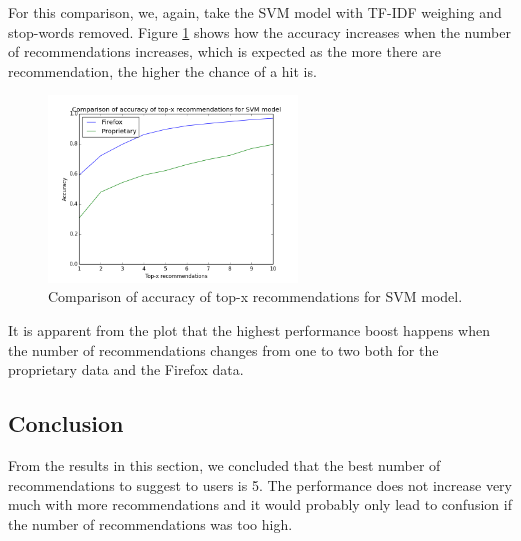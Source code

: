 For this comparison, we, again, take the SVM model with TF-IDF weighing and stop-words removed. Figure \ref{fig:results.topx.svm_accuracy} shows how the accuracy increases when the number of recommendations increases, which is expected as the more there are recommendation, the higher the chance of a hit is.

\begin{figure}[htbp]
    \centering
        \includegraphics[width=250px]{./images/top_x_comparison/svm_accuracy.png}
    \caption{Comparison of accuracy of top-x recommendations for SVM model.}
    \label{fig:results.topx.svm_accuracy}
\end{figure}

It is apparent from the plot that the highest performance boost happens when the number of recommendations changes from one to two both for the proprietary data and the Firefox data. 

\subsection{Conclusion}

From the results in this section, we concluded that the best number of recommendations to suggest to users is 5. The performance does not increase very much with more recommendations and it would probably only lead to confusion if the number of recommendations was too high.